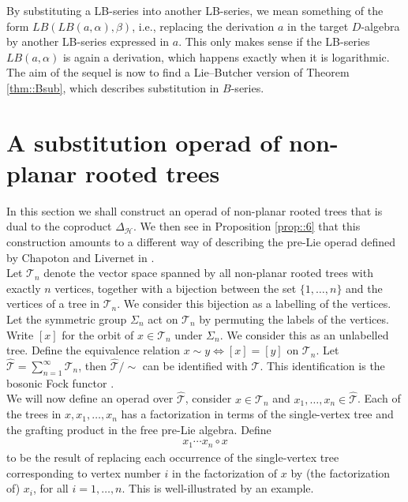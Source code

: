 \documentclass[10pt,a4paper]{article}
\begin{document}
By substituting a LB-series into another LB-series, we mean something of the form $LB(LB(a,\alpha),\beta)$, i.e., replacing the derivation $a$ in the target $D$-algebra by another LB-series expressed in $a$. This only makes sense if the LB-series $LB(a,\alpha)$ is again a derivation, which happens exactly when it is logarithmic. The aim of the sequel is now to find a Lie--Butcher version of Theorem \ref{thm::Bsub}, which describes substitution in $B$-series.


\section{A substitution operad of non-planar rooted trees} 
\label{section::2}

In this section we shall construct an operad of non-planar rooted trees that is dual to the coproduct $\Delta_{\mathcal{H}}$. We then see in Proposition \ref{prop::6} that this construction amounts to a different way of describing the pre-Lie operad defined by Chapoton and Livernet in \cite{ChapotonLivernet2001}. \\

Let $\mathcal{T}_n$ denote the vector space spanned by all non-planar rooted trees with exactly $n$ vertices, together with a bijection between the set $\{1,\dots,n \}$ and the vertices of a tree in $\mathcal{T}_n$. We consider this bijection as a labelling of the vertices. Let the symmetric group $\Sigma_n$ act on $\mathcal{T}_n$ by permuting the labels of the vertices. Write $[x]$ for the orbit of $x \in \mathcal{T}_n$ under $\Sigma_n$. We consider this as an unlabelled tree. Define the equivalence relation $x \sim y \iff [x]=[y]$ on $\mathcal{T}_n$. Let $\hat{\mathcal{T}}=\sum_{n=1}^{\infty}\mathcal{T}_n$, then $\hat{\mathcal{T}}/\sim$ can be identified with $\mathcal{T}$. This identification is the bosonic Fock functor \cite{aguiar2010monoidal}. \\
We will now define an operad over $\hat{\mathcal{T}}$, consider $x \in \mathcal{T}_n$ and $x_1,\dots,x_n \in \hat{\mathcal{T}}$. Each of the trees in $x,x_1,\dots,x_n$ has a factorization in terms of the single-vertex tree and the grafting product in the free pre-Lie algebra. Define
\begin{align*}
x_1 \cdots x_n \circ x
\end{align*}
to be the result of replacing each occurrence of the single-vertex tree corresponding to vertex number $i$ in the factorization of $x$ by (the factorization of) $x_i$, for all $i=1,\dots,n$. This is well-illustrated by an example.
\end{document}
